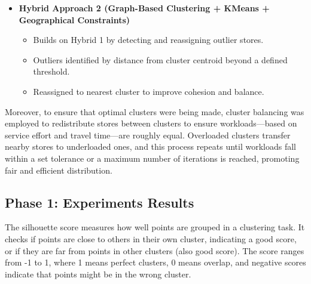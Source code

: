 \begin{itemize}
    \item \textbf{Hybrid Approach 2 (Graph-Based Clustering + KMeans + Geographical Constraints)}
    \begin{itemize}
        \item Builds on Hybrid 1 by detecting and reassigning outlier stores.
        \item Outliers identified by distance from cluster centroid beyond a defined threshold.
        \item Reassigned to nearest cluster to improve cohesion and balance.
    \end{itemize}
\end{itemize}

Moreover, to ensure that optimal clusters were being made, cluster balancing was employed to redistribute 
stores between clusters to ensure workloads—based on service effort and travel time—are roughly equal.
 Overloaded clusters transfer nearby stores to underloaded ones, and this process repeats until workloads fall within a set tolerance or a maximum number of iterations is reached, promoting fair and efficient distribution.

\subsection{Phase 1: Experiments Results}
The silhouette score measures how well points are grouped in a clustering task. It checks if points are close to others in their own cluster, indicating a good score, or if they are far from points in other clusters (also good score). The score ranges from -1 to 1, where 1 means perfect clusters, 0 means overlap, and negative scores indicate that points might be in the wrong cluster.

\begin{table}[H]
    \centering
    \caption{Silhouette Score Comparison for Different Clustering Algorithms}
    \label{tab:silhouette_scores}
    \end{table}


